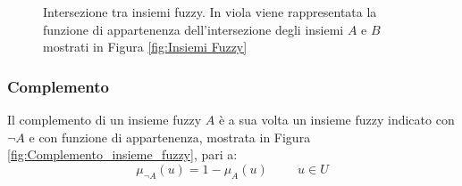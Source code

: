 \documentclass[a4paper,12pt]{report}
\begin{document}
\begin{figure}[ht]
    \centering
    \caption{Intersezione tra insiemi fuzzy. In viola viene rappresentata la funzione di appartenenza dell'intersezione degli insiemi $A$ e $B$ mostrati in Figura \ref{fig:Insiemi Fuzzy}}
    \label{fig:Intersezione_insiemi_fuzzy}   

\end{figure}

\subsubsection{Complemento}
Il complemento di un insieme fuzzy $A$ è a sua volta un insieme fuzzy indicato con $\neg A$ e con funzione di appartenenza, mostrata in Figura \ref{fig:Complemento_insieme_fuzzy}, pari a:
\begin{equation*}
    \mu_{\neg A}(u) = 1 - \mu_A(u) \hspace{1cm}  u\in U
\end{equation*}
\end{document}
